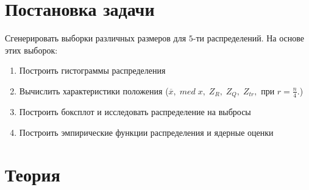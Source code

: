 \documentclass[a4]{article}
\renewcommand{\listoffigures}{\begingroup %
\tocsection
\tocfile{\listfigurename}{lof}
\endgroup}
\begin{document}
\newpage
\pagestyle{plain}




\newpage
\tableofcontents{}
\newpage
\listoffigures{}
\newpage

\section{Постановка задачи}
Сгенерировать выборки различных размеров для $5$-ти распределений.
На основе этих выборок:
\begin{enumerate}
\item Построить гистограммы распределения
\item Вычислить характеристики положения ($\overline{x},\; med\; x,\; Z_R,\; Z_Q,\; Z_{tr},$ при $r = \frac{n}{4}.$)
\item Построить боксплот и исследовать распределение на выбросы
\item Построить эмпирические функции распределения и ядерные оценки
\end{enumerate}

\section{Теория}
\end{document}
